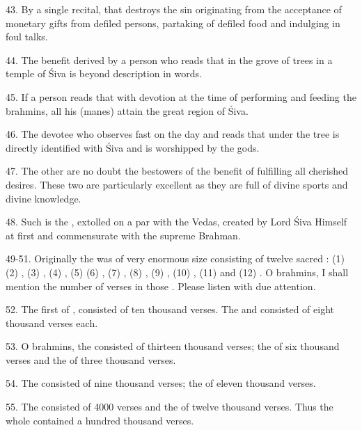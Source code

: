 43. By a single recital, that  destroys the sin originating from
the acceptance of monetary gifts from defiled persons, partaking of defiled food
and indulging in foul talks.

44. The benefit derived by a person who reads that  in the grove of
 trees in a temple of Śiva is beyond description in words.

45. If a person reads that  with devotion at the time of performing
 and feeding the brahmins, all his  (manes) attain
the great region of Śiva.

46. The devotee who observes fast on the  day and reads that
 under the  tree is directly identified with Śiva and is
worshipped by the gods.

47. The other  are no doubt the bestowers of the benefit of
fulfilling all cherished desires. These two  are particularly
excellent as they are full of divine sports and divine knowledge.

48. Such is the , extolled on a par with the Vedas, created by
Lord Śiva Himself at first and commensurate with the supreme Brahman.

49-51. Originally the  was of very enormous size consisting of
twelve sacred : (1)  (2) ,
(3) , (4) , (5)  (6) ,
(7) , (8) , (9) ,
(10) , (11)  and (12) . O brahmins,
I shall mention the number of verses in those . Please listen with
due attention.

52. The first  of , consisted of ten thousand verses.
The  and  consisted of eight
thousand verses each.

53. O brahmins, the  consisted of thirteen thousand
verses; the  of six thousand verses and the 
of three thousand verses.

54. The  consisted of nine thousand verses;
the  of eleven thousand verses.

55. The  consisted of 4000 verses and the  of twelve thousand verses. Thus the whole  contained
a hundred thousand verses.

